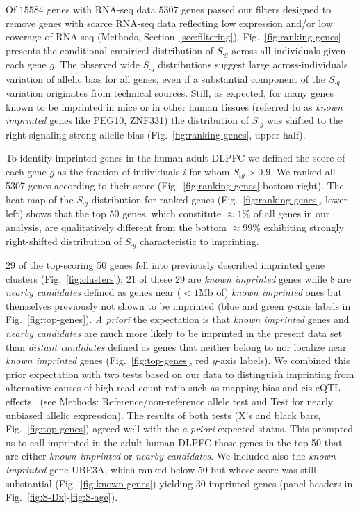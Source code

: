 \documentclass[letterpaper]{article}
\begin{document}
Of \(15584\) genes with RNA-seq data \(5307\) genes passed our filters designed to remove genes with
scarce RNA-seq data reflecting low expression and/or low coverage of
RNA-seq (Methods, Section~\ref{sec:filtering}).
Fig.~\ref{fig:ranking-genes} presents the conditional empirical distribution
of \(S_{\cdot g}\) across all individuals given each gene \(g\).  The observed wide
\(S_{\cdot g}\) distributions suggest large across-individuals variation of allelic bias for all
genes, even if a substantial component of the \(S_{\cdot g}\) variation originates from technical sources.
Still, as expected, for many genes known to be imprinted in mice or in other human tissues
(referred to as \emph{known imprinted} genes like PEG10, ZNF331) the distribution of \(S_{\cdot g}\) was shifted
to the right signaling strong allelic bias (Fig.~\ref{fig:ranking-genes}, upper
half).

To identify imprinted genes in the human adult DLPFC we defined the score of
each gene \(g\) as the fraction of individuals \(i\) for whom \(S_{ig}>0.9\).
We ranked all 5307 genes according to their score
(Fig.~\ref{fig:ranking-genes} bottom right).  The heat map of the \(S_{\cdot
g}\) distribution for ranked genes (Fig.~\ref{fig:ranking-genes}, lower left)
shows that the top \(50\) genes, which constitute \(\approx 1\%\) of all genes
in our analysis, are qualitatively different from the bottom \(\approx 99\%\)
exhibiting strongly right-shifted distribution of \(S_{\cdot g}\)
characteristic to imprinting.

29 of the top-scoring 50 genes fell into previously described imprinted gene
clusters (Fig.~\ref{fig:clusters}); 21 of these 29 are \emph{known imprinted}
genes while 8 are \emph{nearby candidates} defined as genes near
(\(<1\mathrm{Mb}\) of) \emph{known imprinted} ones but themselves previously
not shown to be imprinted (blue and green \(y\)-axis labels in
Fig.~\ref{fig:top-genes}).   \emph{A priori} the expectation is that
\emph{known imprinted} genes and \emph{nearby candidates} are much more likely
to be imprinted  in the present data set than \emph{distant candidates}
defined as genes that neither belong to nor localize near \emph{known
imprinted} genes (Fig.~\ref{fig:top-genes}, red \(y\)-axis labels).  We
combined this prior expectation with two tests based on our data to
distinguish imprinting from alternative causes of high read count ratio such
as mapping bias and cis-eQTL effects~\cite{Babak2015} (see Methods:
Reference/non-reference allele test and Test for nearly unbiased allelic
expression).  The results of both tests (X's and black bars,
Fig.~\ref{fig:top-genes}) agreed well with the \emph{a priori} expected
status.  This prompted us to call imprinted in the adult human DLPFC those
genes in the top 50 that are either
\emph{known imprinted} or \emph{nearby candidates}.
We included also the \emph{known imprinted} gene UBE3A, which ranked below 50
but whose score was still substantial (Fig.~\ref{fig:known-genes}) yielding 30
imprinted genes (panel headers in Fig.~\ref{fig:S-Dx}-\ref{fig:S-age}).
\end{document}
